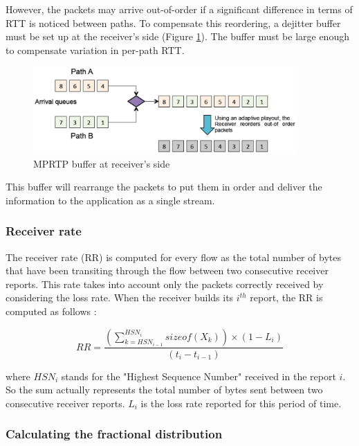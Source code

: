 However, the packets may arrive out-of-order if a significant difference in terms of RTT is noticed between paths. To compensate this reordering, a dejitter buffer must be set up at the receiver's side (Figure \ref{fig:mprtp-dejitter}). The buffer must be large enough to compensate variation in per-path RTT.

\begin{figure}[!ht]
\centering
\includegraphics[width=0.9\textwidth]{images/mprtp-dejitter}
\caption{MPRTP buffer at receiver's side}
\label{fig:mprtp-dejitter}
\end{figure}

This buffer will rearrange the packets to put them in order and deliver the information to the application as a single stream.

\subsubsection{Receiver rate}

The receiver rate (RR) is computed for every flow as the total number of bytes that have been transiting through the flow between two consecutive receiver reports. This rate takes into account only the packets correctly received by considering the loss rate. When the receiver builds its $i^{th}$ report, the RR is computed as follows :

\begin{equation*}
RR = \frac{(\sum_{k = HSN_{i-1}}^{HSN_i} sizeof(X_k)) \times (1 - L_i)}{(t_i - t_{i-1})}
\end{equation*}

where $HSN_i$ stands for the "Highest Sequence Number" received in the report $i$. So the sum actually represents the total number of bytes sent between two consecutive receiver reports. $L_i$ is the loss rate reported for this period of time.

\subsubsection{Calculating the fractional distribution}

